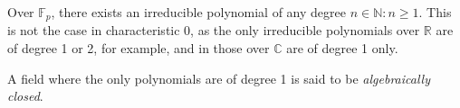 \begin{corollary}
  Over $\mathbb{F}_{p}$, there exists an irreducible polynomial of any degree $n \in \mathbb{N}: n \geqslant 1$. This is not the case in characteristic 0, as the only irreducible polynomials over $\mathbb{R}$ are of degree 1 or 2, for example, and in those over $\mathbb{C}$ are of degree 1 only. 
\end{corollary}
\begin{definition}
  A field where the only polynomials are of degree 1 is said to be \emph{algebraically closed}. 
\end{definition}